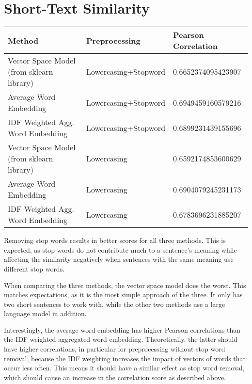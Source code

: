 \section{Short-Text Similarity}

\begin{table}[hb]
\center
\begin{tabular}{|l|l|l|}
\hline
\textbf{Method}                           & \textbf{Preprocessing} & \textbf{Pearson Correlation} \\ \hline
Vector Space Model (from sklearn library) & Lowercasing+Stopword   & 0.6652374095423907           \\ \hline
Average Word Embedding                    & Lowercasing+Stopword   & 0.6949459160579216           \\ \hline
IDF Weighted Agg. Word Embedding          & Lowercasing+Stopword   & 0.6899231439155696           \\ \hline
Vector Space Model (from sklearn library) & Lowercasing            & 0.6592174853600629           \\ \hline
Average Word Embedding                    & Lowercasing            & 0.6904079245231173           \\ \hline
IDF Weighted Agg. Word Embedding          & Lowercasing            & 0.6783696231885207           \\ \hline
\end{tabular}
\end{table}

Removing stop words results in better scores for all three methods.
This is expected, as stop words do not contribute much to a sentence's meaning while affecting the similarity negatively when sentences with the same meaning use different stop words.

When comparing the three methods, the vector space model does the worst.
This matches expectations, as it is the most simple approach of the three.
It only has two short sentences to work with, while the other two methods use a large language model in addition.

Interestingly, the average word embedding has higher Pearson correlations than the IDF weighted aggregated word embedding.
Theoretically, the latter should have higher correlations, in particular for preprocessing without stop word removal, because the IDF weighting increases the impact of vectors of words that occur less often.
This means it should have a similar effect as stop word removal, which should cause an increase in the correlation score as described above.
